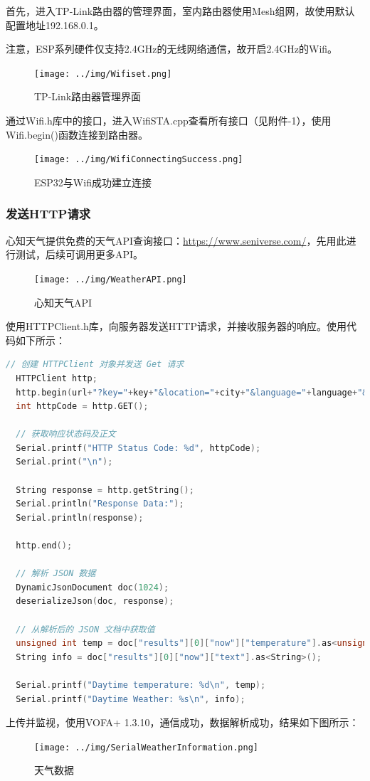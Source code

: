 首先，进入TP-Link路由器的管理界面，室内路由器使用Mesh组网，故使用默认配置地址192.168.0.1。

注意，ESP系列硬件仅支持2.4GHz的无线网络通信，故开启2.4GHz的Wifi。

\begin{figure} [H]
    \centering
    \texttt{[image: ../img/Wifiset.png]}
    \caption{TP-Link路由器管理界面}
\end{figure}

通过Wifi.h库中的接口，进入WifiSTA.cpp查看所有接口（见附件-1），使用Wifi.begin()函数连接到路由器。

\begin{figure} [H]
    \centering
    \texttt{[image: ../img/WifiConnectingSuccess.png]}
    \caption{ESP32与Wifi成功建立连接}
\end{figure}

\subsubsection{发送HTTP请求}

心知天气提供免费的天气API查询接口：\href{https://www.seniverse.com/}{https://www.seniverse.com/}，先用此进行测试，后续可调用更多API。

\begin{figure} [H]
    \centering
    \texttt{[image: ../img/WeatherAPI.png]}
    \caption{心知天气API}
\end{figure}

使用HTTPClient.h库，向服务器发送HTTP请求，并接收服务器的响应。使用代码如下所示：

\begin{lstlisting}[language = C++, title = {发送HTTP请求并解析JSON数据}]
  // 创建 HTTPClient 对象并发送 Get 请求
  HTTPClient http;
  http.begin(url+"?key="+key+"&location="+city+"&language="+language+"&unit="+unit);
  int httpCode = http.GET();

  // 获取响应状态码及正文
  Serial.printf("HTTP Status Code: %d", httpCode);
  Serial.print("\n");

  String response = http.getString();
  Serial.println("Response Data:");
  Serial.println(response);

  http.end();

  // 解析 JSON 数据
  DynamicJsonDocument doc(1024);
  deserializeJson(doc, response);

  // 从解析后的 JSON 文档中获取值
  unsigned int temp = doc["results"][0]["now"]["temperature"].as<unsigned int>();
  String info = doc["results"][0]["now"]["text"].as<String>();

  Serial.printf("Daytime temperature: %d\n", temp);
  Serial.printf("Daytime Weather: %s\n", info);
\end{lstlisting}

上传并监视，使用VOFA+ 1.3.10，通信成功，数据解析成功，结果如下图所示：

\begin{figure} [H]
    \centering
    \texttt{[image: ../img/SerialWeatherInformation.png]}
    \caption{天气数据}
\end{figure}